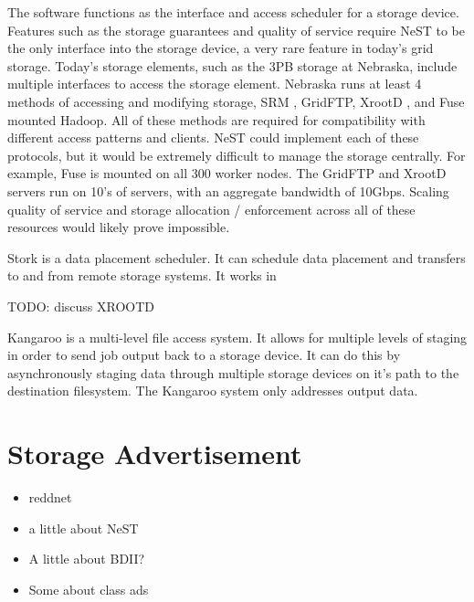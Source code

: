 The software functions as the interface and access scheduler for a storage device.  Features such as the storage guarantees and quality of service require NeST to be the only interface into the storage device, a very rare feature in today's grid storage.  Today's storage elements, such as the 3PB storage at Nebraska, include multiple interfaces to access the storage element.  Nebraska runs at least 4 \cite{attebury2009hadoop} methods of accessing and modifying storage, SRM \cite{shoshani2002storage}, GridFTP, XrootD \cite{dorigo2005xrootd}, and Fuse \cite{szeredi2010fuse} mounted Hadoop.  All of these methods are required for compatibility with different access patterns and clients.  NeST could implement each of these protocols, but it would be extremely difficult to manage the storage centrally.  For example, Fuse is mounted on all 300 worker nodes.  The GridFTP and XrootD servers run on 10's of servers, with an aggregate bandwidth of 10Gbps.  Scaling quality of service and storage allocation / enforcement across all of these resources would likely prove impossible.

Stork \cite{kosar2004stork} is a data placement scheduler.  It can schedule data placement and transfers to and from remote storage systems.  It works in

TODO: discuss XROOTD

Kangaroo \cite{thain2001kangaroo} is a multi-level file access system.  It allows for multiple levels of staging in order to send job output back to a storage device.  It can do this by asynchronously staging data through multiple storage devices on it's path to the destination filesystem.  The Kangaroo system only addresses output data.

\section{Storage Advertisement}

\begin{itemize}
\item reddnet
\item a little about NeST
\item A little about BDII?
\item Some about class ads
\end{itemize}




